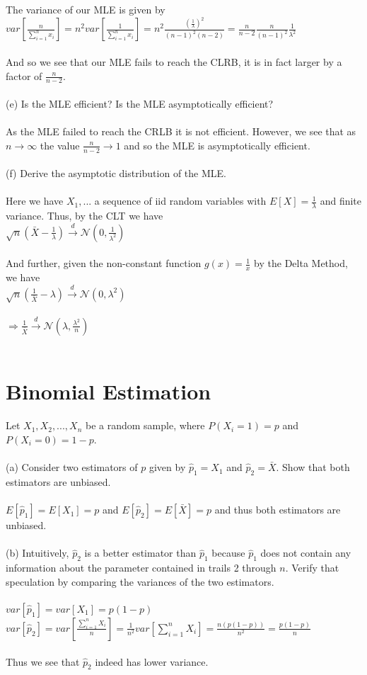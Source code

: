 \documentclass{article}
\begin{document}
The variance of our MLE is given by\\ 
$var[\frac{n}{\sum_{i=1}^nx_i}]=n^2var[\frac{1}{\sum_{i=1}^nx_i}]=n^2\frac{(\frac{1}{\lambda})^2}{(n-1)^2(n-2)}=\frac{n}{n-2}\frac{n}{(n-1)^2}\frac{1}{\lambda^2}$\\\\
And so we see that our MLE fails to reach the CLRB, it is in fact larger by a factor of $\frac{n}{n-2}$.\\\\
(e) Is the MLE efficient?  Is the MLE asymptotically efficient?\\\\
As the MLE failed to reach the CRLB it is not efficient.  However, we see that as $n\rightarrow\infty$ the value $\frac{n}{n-2}\rightarrow1$ and so the MLE is asymptotically efficient.\\\\
(f) Derive the asymptotic distribution of the MLE.\\\\
Here we have $X_1,...$ a sequence of iid random variables with $E[X]=\frac{1}{\lambda}$ and finite variance. Thus, by the CLT we have\\
$\sqrt{n}(\bar{X}-\frac{1}{\lambda})\xrightarrow{d}\mathcal{N}(0,\frac{1}{\lambda^2})$\\\\
And further, given the non-constant function $g(x)=\frac{1}{x}$ by the Delta Method, we have\\
$\sqrt{n}(\frac{1}{\bar{X}}-\lambda)\xrightarrow{d}\mathcal{N}(0,\lambda^2)$\\\\
$\Rightarrow \frac{1}{\bar{X}}\xrightarrow{d}\mathcal{N}(\lambda,\frac{\lambda^2}{n})$\\\\
\section{Binomial Estimation}
Let $X_1,X_2,...,X_n$ be a random sample, where $P(X_i=1)=p$ and $P(X_i=0)=1-p$.\\\\
(a) Consider two estimators of $p$ given by $\hat{p}_1=X_1$ and $\hat{p}_2=\bar{X}$.  Show that both estimators are unbiased.\\\\
$E[\hat{p}_1]=E[X_1]=p$ and $E[\hat{p}_2]=E[\bar{X}]=p$ and thus both estimators are unbiased.\\\\
(b) Intuitively, $\hat{p}_2$ is a better estimator than $\hat{p}_1$ because $\hat{p}_1$ does not contain any information about the parameter contained in trails 2 through $n$.  Verify that speculation by comparing the variances of the two estimators.\\\\
$var[\hat{p}_1]=var[X_1]=p(1-p)$\\
$var[\hat{p}_2]=var[\frac{\sum_{i=1}^nX_i}{n}]=\frac{1}{n^2}var[\sum_{i=1}^nX_i]=\frac{n(p(1-p))}{n^2}=\frac{p(1-p)}{n}$\\\\
Thus we see that $\hat{p}_2$ indeed has lower variance.  
\end{document}
